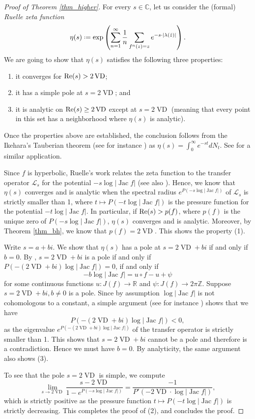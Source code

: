 \documentclass[11pt]{amsart}
\theoremstyle{plain}
\theoremstyle{definition}
\theoremstyle{remark}
\newcommand*{\defeq}{\mathrel{\vcenter{\baselineskip0.5ex \lineskiplimit0pt
			\hbox{\scriptsize.}\hbox{\scriptsize.}}}%
	=}
\DeclareMathOperator{\VD}{VD}
\DeclareMathOperator{\Jac}{Jac}
\begin{document}
\begin{proof}[Proof of Theorem \ref{thm_higher}]
For every $s \in \mathbb C$,
let us consider the (formal)
\emph{Ruelle zeta function}
$$\eta(s) \defeq \exp \left(\sum_{n=1}^\infty \frac{1}{n} \sum_{f^n(z) = z} e^{-s\cdot |\lambda(\hat{z})|} \right).$$
We are going to show that $\eta(s)$ satisfies the following three properties:
\begin{enumerate}
\item it converges for ${\rm Re}(s) > 2\VD$;
\item it has a simple pole at $s = 2\VD$; and 
\item it is analytic on ${\rm Re}(s) \ge 2\VD$ except at $s = 2\VD$
(meaning that every point in this set has a neighborhood where $\eta(s)$ is analytic).
\end{enumerate}
Once the
properties above are established, the conclusion follows from the Ikehara’s Tauberian theorem (see for instance \cite{Lang94}) as $\eta(s) = \int_0^\infty e^{-st}dN_t$. See \cite{PS97Circle} for a similar application.

\medskip


Since $f$ is hyperbolic,
Ruelle's work \cite{Ruelle90} 
relates the zeta function to the transfer operator $\mathcal{L}_s$ for the potential $-s\log |\Jac f|$ (see also \cite[Section 6]{Oh17}). Hence, we know that $\eta(s)$ converges and is analytic when the spectral radius $e^{P(-s\log|\Jac f|)}$ of $\mathcal{L}_s$ is strictly smaller than 1, where $t\mapsto P(-t\log|\Jac f|)$ is the pressure function for the potential $-t\log |\Jac f|$. 
In particular, if ${\rm Re}(s) > p(f)$, where $p(f)$ is the unique zero of $P(-s\log|\Jac f|)$, $\eta(s)$ converges and is analytic. Moreover, by
Theorem \ref{thm_bh},
we know that $p(f) = 2\VD$.
This shows the property (1).

\medskip

Write $s = a +bi$. We show that $\eta(s)$ has a pole at $s = 2\VD + bi$ if and only if $b =0$. By \cite[Proposition 3]{PS97Circle},
$s = 2\VD + bi$ is a pole if and only if $P(-(2\VD+bi)\log |\Jac f|) = 0$, if and only if
\begin{equation} \label{eq_2.21}
-b\log |\Jac f| = u \circ f - u +\psi
\end{equation}
for some continuous functions $u \colon J(f) \to \mathbb R$ and $\psi \colon J(f) \to 2\pi \mathbb{Z}$. 
Suppose $s = 2\VD + bi, b\neq 0$ is a pole.
Since by assumption 
$\log |\Jac f|$ is not cohomologous to a constant,
a simple argument 
(see for instance \cite[Lemma 5.14]{BD24eq2})
shows that we have
\[P(-(2\VD+bi)\log |\Jac f|) < 0,\]
as the eigenvalue $e^{P(-(2\VD+bi)\log |\Jac f|)}$ of the transfer operator is strictly smaller than 1.
This shows that $s = 2\VD + bi$ cannot be a pole and therefore is a contradiction. Hence we must have $b=0$. By analyticity, the same argument also shows (3).
\medskip


To see that the pole $s = 2\VD$ is simple, we compute
$$\lim_{s \to 2\VD} \frac{s-2\VD}{1-e^{P(-s\log|\Jac f|)}} = \frac{-1}{P'(-2\VD \cdot \log |\Jac f|)},$$
which is strictly
positive
as the pressure function $t\mapsto P(-t\log |\Jac f|)$ is strictly decreasing.
This completes the proof of
(2), and concludes the proof.
\end{proof}
\end{document}
